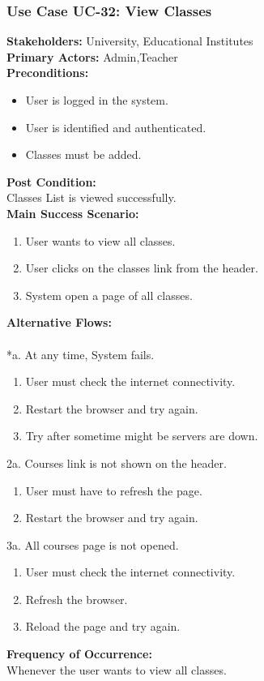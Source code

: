 \documentclass[12pt]{article}
\begin{document}
\subsubsection{Use Case UC-32: View Classes}
\textbf{Stakeholders: } University, Educational Institutes \\
\textbf{Primary Actors: }Admin,Teacher\\
\textbf{Preconditions:}
\begin{itemize}
\item User is logged in the system.
\item User is identified and authenticated.
\item Classes must be added.
\end{itemize}
\textbf{Post Condition: }\\
Classes List is viewed successfully.\\
\textbf{Main Success Scenario:}
\begin{enumerate}
\item User wants to view all classes.
\item User clicks on the classes link from the header.
\item System open a page of all classes.
\end{enumerate}
\textbf{Alternative Flows:}\\
\\
*a. At any time, System fails.
\begin{enumerate}
\item User must check the internet connectivity.
\item Restart the browser and try again.
\item Try after sometime might be servers are down.
\end{enumerate}
2a. Courses link is not shown on the header.
\begin{enumerate}
\item User must have to refresh the page.
\item Restart the browser and try again.
\end{enumerate} 
\newpage
3a. All courses page is not opened.
\begin{enumerate}
\item User must check the internet connectivity.
\item Refresh the browser.
\item Reload the page and try again.
\end{enumerate}
\textbf{Frequency of Occurrence:}\\
Whenever the user wants to view all classes.
\end{document}
